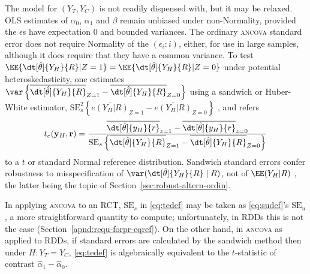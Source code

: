The model for $(Y_{T}, Y_{C})$ is not readily dispensed with, but it
may be relaxed.  OLS estimates of $\alpha_{0}$, $\alpha_{1}$ and
$\beta$ remain unbiased under non-Normality, provided
the $\epsilon$s have expectation 0 and bounded variances.  The
ordinary \textsc{ancova} standard error does not require Normality of
the $( \epsilon_{i}: i )$, either, for use in large samples, although
it does require that they have a common variance.  To test
$\EE\{ \dt[\hat\theta]{{Y_H}}{ R} | Z=1\} = \EE\{ \dt[\hat\theta]{{Y_H}}{
R} | Z=0\}$
under potential heteroskedasticity, one estimates
$\var\left\{ \overline{\dt[\hat\theta]{{Y_H}}{ R}}_{Z=1}
  -\overline{\dt[\hat\theta]{{Y_H}}{ R}}_{Z=0} \right\}$
using a sandwich or Huber-White estimator,
$\mathrm{SE}_{s}^{2} \left\{ \overline{e({Y_H}| R)}_{Z=1} -
  \overline{e({Y_H}| R)}_{Z=0} \right\}$
\citep{huber1967behavior,mackinnonWhite1985sandwichHC,longErvin2000sandwichHC,
bellmccaffrey2002sandwichSEs,pustejovskyTipton2017sandwichSEs}, %
and refers
\begin{equation} \label{eq:tedef}
t_{e} (\mathbf{y}_H,\mathbf{r}) =
\frac{\overline{\dt[\hat\theta]{{y_H}}{ r}}_{z=1} -
                             \overline{\dt[\hat\theta]{{y_H}}{ r}}_{z=0}}%
                           {\mathrm{SE}_{s}\left\{ \overline{\dt[\hat\theta]{{Y_H}}{ R}}_{Z=1} -
                             \overline{\dt[\hat\theta]{{Y_H}}{ R}}_{Z=0}
                           \right\} }
\end{equation}
to a $t$ or standard Normal reference distribution.
Sandwich standard errors confer robustness to misspecification of
$\var(\dt[\hat\theta]{Y_{H}}{R}\mid  R)$, not of $\EE(Y_{H}| R)$ \citep{freedman2006sch}, the latter being the topic of
Section~\ref{sec:robust-altern-ordin}.

In applying \textsc{ancova} to an RCT, $\mathrm{SE}_{s}$ in
\eqref{eq:tedef} may be taken as \eqref{eq:sudef}'s
$\mathrm{SE}_{u}$%
, a more straightforward quantity to compute; unfortunately, in RDDs
this is not the case
(Section~\ref{apnd:requ-forpr-eqref}).  On the
other hand, in \textsc{ancova} as applied to RDDs, if standard
errors are calculated by the sandwich method then under
$H: Y_{T} = Y_{C}$, \eqref{eq:tedef} is algebraically equivalent to the
$t$-statistic of contrast $\hat{\alpha}_{1} -\hat{\alpha}_{0}$.




